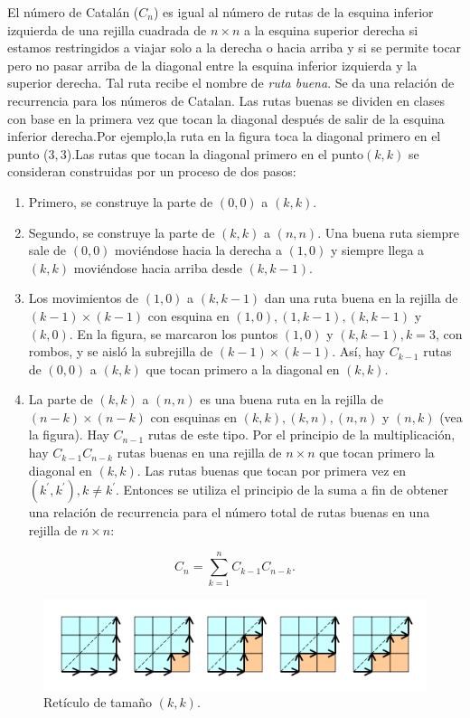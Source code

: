 \begin{example}
	El número de Catalán ($C_{n} $) es igual al número de rutas de la esquina inferior izquierda de una rejilla cuadrada de $n\times n$ a la esquina superior derecha si estamos restringidos a viajar solo a la derecha o hacia arriba y si se permite tocar pero no pasar arriba de la diagonal entre la esquina inferior izquierda y la superior derecha. Tal ruta recibe el nombre de \emph{ruta buena}. Se da una relación de recurrencia para los números de Catalan. Las rutas buenas se dividen en clases con base en  la primera vez que tocan la diagonal después de salir de la esquina inferior derecha.Por ejemplo,la ruta en la figura toca la diagonal primero en el punto ($3,3$).Las rutas que tocan la diagonal primero en el punto$(k,k)$ se consideran construidas por un proceso de dos pasos:
	\begin{enumerate}
		\item Primero, se construye la parte de $(0,0)$ a $(k,k)$.
		\item Segundo, se construye la parte de $(k,k)$ a $(n,n)$. Una buena ruta siempre sale de $(0,0)$ moviéndose hacia la derecha a $(1,0)$ y siempre llega a $(k,k)$ moviéndose hacia arriba desde $(k,k-1)$.
		\item Los movimientos de $(1,0)$ a $(k,k-1)$ dan una ruta buena en la rejilla de $(k-1)\times(k-1) $ con esquina en $ (1,0),(1,k-1),(k,k-1)$ y $ (k,0)$. En la figura, se marcaron los puntos $(1,0)$ y $(k,k-1),k=3$, con rombos, y se aisló la subrejilla de $(k-1)\times(k-1)$. Así, hay $C_{k-1}$ rutas de $(0,0)$ a $(k,k)$ que tocan primero a la diagonal en $(k,k)$.
		\item La parte de $(k,k)$ a $(n,n)$ es una buena ruta en la rejilla de $(n-k)\times(n-k)$ con esquinas en $(k,k),(k,n),(n,n)$ y $(n,k)$ (vea la figura). Hay $C_{n-1}$ rutas de este tipo. Por el principio de la multiplicación, hay $C_{k-1}C_{n-k}$ rutas buenas en una rejilla de $n\times n$ que tocan primero la diagonal en $(k,k)$. Las rutas buenas que tocan por primera vez en $(k^{\prime}, k^{\prime}),k\neq k^{\prime}$. Entonces se utiliza el principio de la suma a fin de obtener una relación de recurrencia para el número total de rutas buenas en una rejilla de $n\times n$:
	\end{enumerate}
	\[ C_{n}=\sum_{k=1}^{n}C_{k-1}C_{n-k}. \]
	\begin{figure}[ht!]
		\sidecaption[t]%
		\centering
		\includegraphics[width=0.4\paperwidth]{./img/catalan.png}
		\caption{\label{fig:hanoi} Retículo de tamaño $\left(k,k\right)$.}
	\end{figure}
\end{example}



